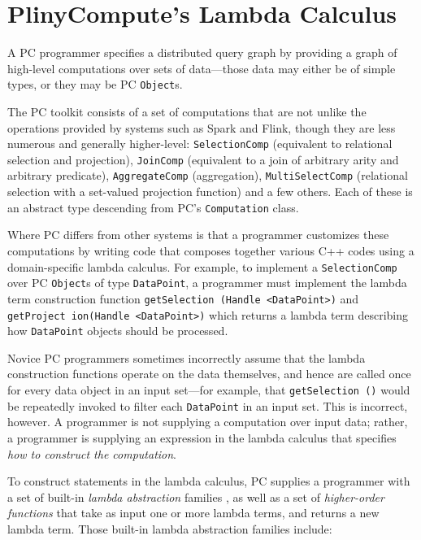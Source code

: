 \section{PlinyCompute's Lambda Calculus}
\label{sec:lambda}
A PC programmer specifies a distributed query graph by providing a graph of high-level computations over sets of data---those data
may either be of simple types, or they may be
PC \texttt{Object}s. 

The PC toolkit consists of a set of
computations 
that are not unlike the operations provided by systems such as Spark and Flink, though they are less numerous and generally higher-level:
\texttt{SelectionComp} (equivalent to relational selection and projection), \texttt{JoinComp} (equivalent to a join of arbitrary arity and arbitrary predicate), 
\texttt{AggregateComp} (aggregation), \texttt{MultiSelectComp} (relational selection with a set-valued projection function) and a few others.  
Each of these is an abstract type descending from PC's \texttt{Computation} class.

Where PC differs from other systems is that a programmer customizes these computations by writing code that composes together various C++ codes 
using a 
domain-specific lambda calculus.
For example, to implement a \texttt{SelectionComp} over PC \texttt{Object}s of type \texttt{DataPoint}, a programmer
must implement the lambda term construction function
\texttt{getSelection (Handle <DataPoint>)} and \texttt{getProject ion(Handle <DataPoint>)} which returns a lambda term
describing how \texttt{DataPoint} objects
should be processed.

Novice PC programmers sometimes incorrectly assume that the lambda construction functions operate on the data themselves, and
hence are called once for every data object in an input set---for example, 
that
\texttt{getSelection ()} would be repeatedly invoked to filter each \texttt{DataPoint} in an input set.  
This is incorrect, however.
A programmer is not supplying a computation over input data; rather, a programmer is supplying an expression in the lambda calculus that 
specifies \emph{how to construct the computation}.

To construct statements in the lambda calculus, PC supplies a programmer with a set of built-in \emph{lambda abstraction} 
families \cite{miller1991logic}, as 
well as a set of \emph{higher-order functions} \cite{chen1993hilog}
that take as input one or more lambda terms, and returns a new lambda term.  Those built-in lambda abstraction families 
include:

